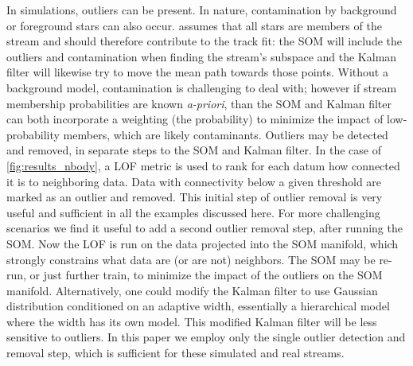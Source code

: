 \documentclass[fleqn,usenatbib]{mnras}
\begin{document}
    In simulations, outliers can be present. In nature, contamination by
    background or foreground stars can also occur. \trackstream{} assumes that
    all stars are members of the stream and should therefore contribute to the
    track fit: the SOM will include the outliers and contamination when finding
    the stream's subspace and the Kalman filter will likewise try to move the
    mean path towards those points. Without a background model, contamination is
    challenging to deal with; however if stream membership probabilities are
    known \emph{a-priori}, than the SOM and Kalman filter can both incorporate a
    weighting (the probability) to minimize the impact of low-probability
    members, which are likely contaminants. Outliers may be detected and
    removed, in separate steps to the SOM and Kalman filter. In the case of
    \autoref{fig:results_nbody}, a LOF metric is used to rank for each datum how
    connected it is to neighboring data. Data with connectivity below a given
    threshold are marked as an outlier and removed. This initial step of outlier
    removal is very useful and sufficient in all the examples discussed here.
    For more challenging scenarios we find it useful to add a second outlier
    removal step, after running the SOM. Now the LOF is run on the data
    projected into the SOM manifold, which strongly constrains what data are (or
    are not) neighbors. The SOM may be re-run, or just further train, to
    minimize the impact of the outliers on the SOM manifold. Alternatively, one
    could modify the Kalman filter to use Gaussian distribution conditioned on
    an adaptive width, essentially a hierarchical model where the width has its
    own model. This modified Kalman filter will be less sensitive to outliers.
    In this paper we employ only the single outlier detection and removal step,
    which is sufficient for these simulated and real streams.
\end{document}
